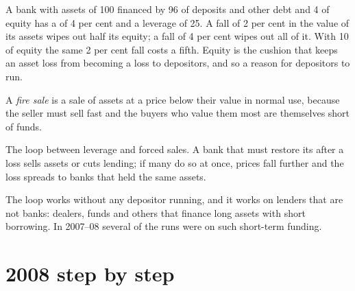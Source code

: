 A bank with assets of 100 financed by 96 of deposits and other debt and 4 of equity has a  of 4 per cent and
a leverage of 25. A fall of 2 per cent in the value of its assets wipes out half its equity; a fall of 4 per cent wipes out
all of it. With 10 of equity the same 2 per cent fall costs a fifth. Equity is the cushion that keeps an asset loss from
becoming a loss to depositors, and so a reason for depositors to run.

\begin{definition}\label{def:b2:banks-and-crises:fire-sale}
A \emph{fire sale} is a sale of assets at a price below their value in normal use, because the seller must
sell fast and the buyers who value them most are themselves short of funds.
\end{definition}

\begin{omfigure}

{\small The loop between leverage and forced sales. A bank that must restore its  after a loss sells assets
or cuts lending; if many do so at once, prices fall further and the loss spreads to banks that held the same assets.}
\end{omfigure}

The loop works without any depositor running, and it works on lenders that are not banks: dealers, funds and others that
finance long assets with short borrowing. In 2007--08 several of the runs were on such short-term funding.

\section{2008 step by step}\label{sec:b2:banks-and-crises:2008}


